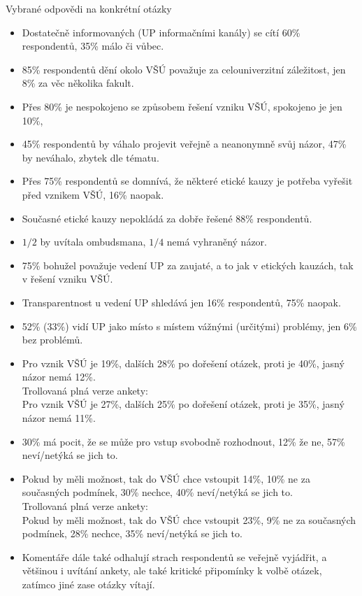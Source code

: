 \documentclass[a4paper,twoside]{article}
\begin{document}
Vybrané odpovědi na konkrétní otázky
\begin{itemize}
  \item Dostatečně informovaných (UP informačními kanály) se cítí 60\% respondentů, 35\% málo či vůbec.
  \item 85\% respondentů  dění okolo VŠÚ považuje za celouniverzitní záležitost, jen 8\% za věc několika fakult.
  \item Přes 80\% je nespokojeno se způsobem řešení vzniku VŠÚ, spokojeno je jen 10\%, 
  \item 45\% respondentů by váhalo projevit veřejně a neanonymně svůj názor, 47\% by neváhalo, zbytek dle tématu.
  \item Přes 75\% respondentů se domnívá, že některé etické kauzy je potřeba vyřešit před vznikem VŠÚ, 16\% naopak.
  \item Současné etické kauzy nepokládá za dobře řešené 88\% respondentů.
  \item $1/2$ by uvítala ombudsmana, $1/4$ nemá vyhraněný názor.
  \item 75\% bohužel považuje vedení UP za zaujaté, a to jak v etických kauzách, tak v řešení vzniku VŠÚ.
  \item Transparentnost u vedení UP shledává jen 16\% respondentů, 75\% naopak.
  \item 52\% (33\%) vidí UP jako místo s místem vážnými (určitými) problémy, jen 6\% bez problémů.
  \item Pro vznik VŠÚ je 19\%, dalších 28\% po dořešení otázek, proti je 40\%, jasný názor nemá 12\%.
    \\ Trollovaná plná verze ankety:
    \\ Pro vznik VŠÚ je 27\%, dalších 25\% po dořešení otázek, proti je 35\%, jasný názor nemá 11\%.
  \item 30\% má pocit, že se může pro vstup svobodně rozhodnout, 12\% že ne, 57\% neví/netýká se jich to.
  \item Pokud by měli možnost, tak do VŠÚ chce vstoupit 14\%, 10\% ne za současných podmínek, 30\% nechce, 40\% neví/netýká se jich to.
    \\ Trollovaná plná verze ankety:
    \\ Pokud by měli možnost, tak do VŠÚ chce vstoupit 23\%, 9\% ne za současných podmínek, 28\% nechce, 35\% neví/netýká se jich to.
  \item Komentáře dále také odhalují strach respondentů se veřejně vyjádřit, a většinou i uvítání ankety, ale také kritické připomínky k volbě otázek, zatímco jiné zase otázky vítají.
\end{itemize}
\end{document}
